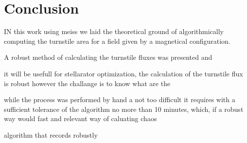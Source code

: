 \chapter{Conclusion}
IN this work using meiss we laid the theoretical ground of algorithmically computing the turnstile area for a field given by a magnetical configuration. 

A robust method of calculating the turnstile fluxes was presented and


it will be usefull for stellarator optimization, the calculation of the turnstile flux is robust however the challange is to know what are the 

while the process was performed by hand a not too difficult it requires with a sufficient tolerance of the algorithm no more than 10 minutes, which, if a robust way would fast and relevant way of caluating chaos 

algorithm that records robustly 
